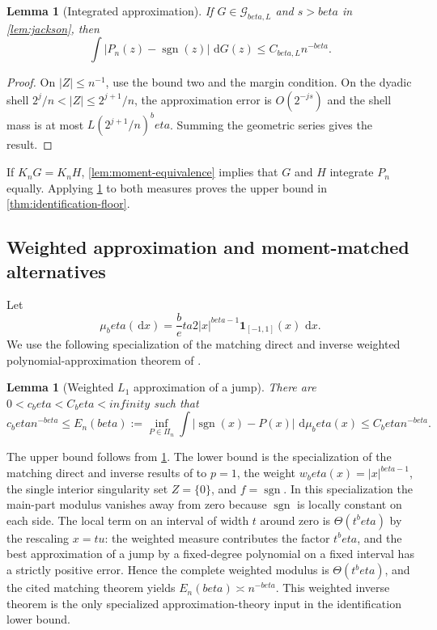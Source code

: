 \documentclass[11pt]{article}
\def\beta{beta}%
\def\infty{infinity}%
\newtheorem{lemma}[theorem]{Lemma}
\newcommand{\one}{\mathbf 1}
\newcommand{\sgn}{\operatorname{sgn}}
\newcommand{\calG}{\mathcal G}
\newcommand{\dd}{\,\mathrm d}
\begin{document}
\begin{lemma}[Integrated approximation]
\label{lem:integrated-approx-paper}
If $G\in\calG_{\beta,L}$ and $s>\beta$ in \cref{lem:jackson}, then
\[
\int|P_n(z)-\sgn(z)|\,\dd G(z)
\le C_{\beta,L}n^{-\beta}.
\]
\end{lemma}

\begin{proof}
On $|Z|\le n^{-1}$, use the bound two and the margin condition.  On the dyadic shell $2^j/n<|Z|\le2^{j+1}/n$, the approximation error is $O(2^{-js})$ and the shell mass is at most $L(2^{j+1}/n)^\beta$.  Summing the geometric series gives the result.
\end{proof}

If $K_nG=K_nH$, \cref{lem:moment-equivalence} implies that $G$ and $H$ integrate $P_n$ equally.  Applying \cref{lem:integrated-approx-paper} to both measures proves the upper bound in \cref{thm:identification-floor}.

\subsection{Weighted approximation and moment-matched alternatives}

Let
\[
\mu_\beta(\dd x)
=
\frac\beta2|x|^{\beta-1}\one_{[-1,1]}(x)\,\dd x.
\]
We use the following specialization of the matching direct and inverse weighted polynomial-approximation theorem of \citet{Kopotun}.

\begin{lemma}[Weighted $L_1$ approximation of a jump]
\label{lem:weighted-sign-paper}
There are $0<c_\beta<C_\beta<\infty$ such that
\[
c_\beta n^{-\beta}
\le
E_n(\beta)
:=
\inf_{P\in\Pi_n}
\int|\sgn(x)-P(x)|\,\dd\mu_\beta(x)
\le
C_\beta n^{-\beta}.
\]
\end{lemma}

The upper bound follows from \cref{lem:integrated-approx-paper}.  The lower bound is the specialization of the matching direct and inverse results of \citet[Theorems~5.2 and~9.1]{Kopotun} to $p=1$, the weight $w_\beta(x)=|x|^{\beta-1}$, the single interior singularity set $Z=\{0\}$, and $f=\sgn$.  In this specialization the main-part modulus vanishes away from zero because $\sgn$ is locally constant on each side.  The local term on an interval of width $t$ around zero is $\Theta(t^\beta)$ by the rescaling $x=tu$: the weighted measure contributes the factor $t^\beta$, and the best approximation of a jump by a fixed-degree polynomial on a fixed interval has a strictly positive error.  Hence the complete weighted modulus is $\Theta(t^\beta)$, and the cited matching theorem yields $E_n(\beta)\asymp n^{-\beta}$.  This weighted inverse theorem is the only specialized approximation-theory input in the identification lower bound.
\end{document}
